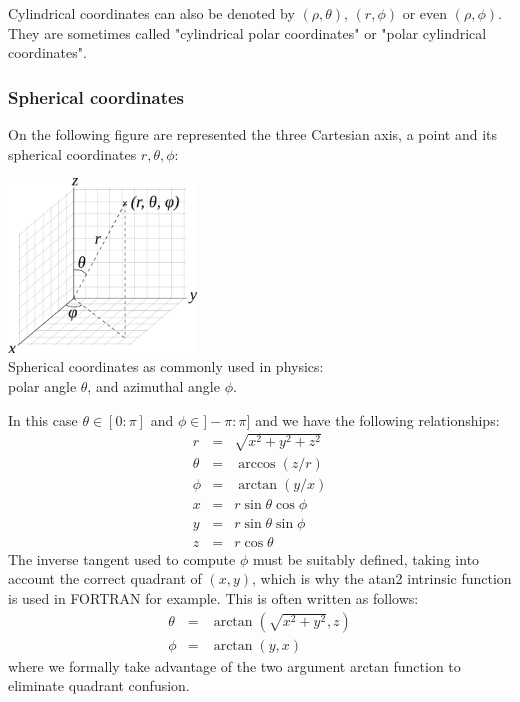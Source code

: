\begin{remark} 
Cylindrical coordinates can also be denoted by $(\rho,\theta)$, $(r,\phi)$ or even $(\rho,\phi)$.
They are sometimes called "cylindrical polar coordinates" or "polar cylindrical coordinates".
\end{remark}

\subsubsection{Spherical coordinates \label{ss:sphercoord}}

On the following figure are represented the three Cartesian axis, 
a point and its spherical coordinates $r,\theta,\phi$:
\begin{center}
\includegraphics[width=5cm]{images/sphcoord}\\
{\captionfont Spherical coordinates as commonly used in physics:\\ polar angle $\theta$, and azimuthal angle $\phi$.} 
\end{center}
In this case $\theta\in[0:\pi]$ and $\phi\in]-\pi:\pi]$ and we have the following relationships:
\begin{eqnarray}
r &=& \sqrt{x^2+y^2+z^2} \\
\theta &=& \arccos (z/r) \\
\phi &=& \arctan (y/x) \\
x &=& r \sin \theta \cos \phi \\
y &=& r \sin\theta \sin\phi \\
z &=& r \cos\theta 
\end{eqnarray}
The inverse tangent used to compute $\phi$ must be suitably defined, 
taking into account the correct quadrant of $(x,y)$,
which is why the atan2 intrinsic function is used in \textsc{FORTRAN} for example.    
This is often written as follows:
\begin{eqnarray}
\theta &=& \arctan \left(\sqrt{x^2+y^2},z\right) \\
\phi &=& \arctan (y,x) 
\end{eqnarray}
where we formally take advantage of the two argument arctan
function to eliminate quadrant confusion.

